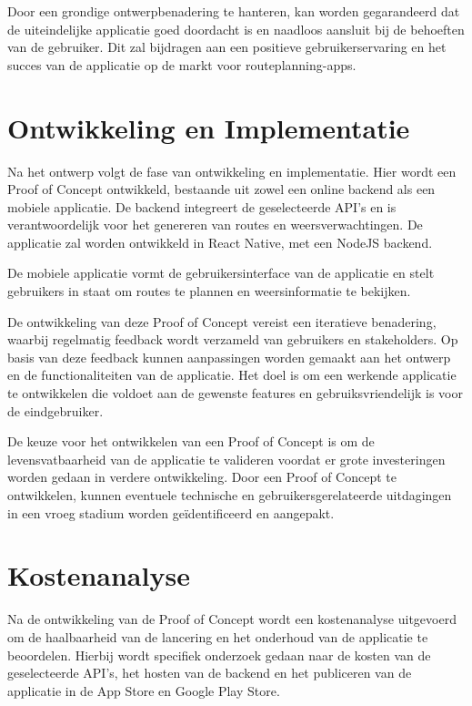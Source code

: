 \vspace{1cm}


Door een grondige ontwerpbenadering te hanteren, kan worden gegarandeerd dat de uiteindelijke applicatie goed doordacht is en naadloos aansluit bij de behoeften van de gebruiker. 
Dit zal bijdragen aan een positieve gebruikerservaring en het succes van de applicatie op de markt voor routeplanning-apps.

\section{Ontwikkeling en Implementatie}

Na het ontwerp volgt de fase van ontwikkeling en implementatie. Hier wordt een Proof of Concept ontwikkeld, bestaande uit zowel een online backend als een mobiele applicatie. 
De backend integreert de geselecteerde API's en is verantwoordelijk voor het genereren van routes en weersverwachtingen. De applicatie zal worden ontwikkeld in React Native, met een NodeJS backend.

\vspace{1cm}

De mobiele applicatie vormt de gebruikersinterface van de applicatie en stelt gebruikers in staat om routes te plannen en weersinformatie te bekijken.

De ontwikkeling van deze Proof of Concept vereist een iteratieve benadering, waarbij regelmatig feedback wordt verzameld van gebruikers en stakeholders. 
Op basis van deze feedback kunnen aanpassingen worden gemaakt aan het ontwerp en de functionaliteiten van de applicatie. 
Het doel is om een werkende applicatie te ontwikkelen die voldoet aan de gewenste features en gebruiksvriendelijk is voor de eindgebruiker.

\vspace{1cm}


De keuze voor het ontwikkelen van een Proof of Concept is om de levensvatbaarheid van de applicatie te valideren voordat er grote investeringen worden gedaan in verdere ontwikkeling. 
Door een Proof of Concept te ontwikkelen, kunnen eventuele technische en gebruikersgerelateerde uitdagingen in een vroeg stadium worden geïdentificeerd en aangepakt.

\section{Kostenanalyse}

Na de ontwikkeling van de Proof of Concept wordt een kostenanalyse uitgevoerd om de haalbaarheid van de lancering en het onderhoud van de applicatie te beoordelen. 
Hierbij wordt specifiek onderzoek gedaan naar de kosten van de geselecteerde API's, het hosten van de backend en het publiceren van de applicatie in de App Store en Google Play Store.

